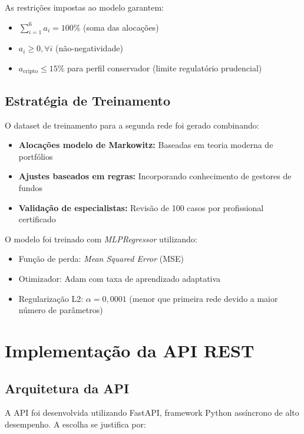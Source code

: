 As restrições impostas ao modelo garantem:
\begin{itemize}
    \item $\sum_{i=1}^{6} a_i = 100\%$ (soma das alocações)
    \item $a_i \geq 0, \forall i$ (não-negatividade)
    \item $a_{\text{cripto}} \leq 15\%$ para perfil conservador (limite regulatório prudencial)
\end{itemize}

\subsection{Estratégia de Treinamento}

O dataset de treinamento para a segunda rede foi gerado combinando:

\begin{itemize}
    \item \textbf{Alocações modelo de Markowitz:} Baseadas em teoria moderna de portfólios
    \item \textbf{Ajustes baseados em regras:} Incorporando conhecimento de gestores de fundos
    \item \textbf{Validação de especialistas:} Revisão de 100 casos por profissional certificado
\end{itemize}

O modelo foi treinado com \textit{MLPRegressor} utilizando:
\begin{itemize}
    \item Função de perda: \textit{Mean Squared Error} (MSE)
    \item Otimizador: Adam com taxa de aprendizado adaptativa
    \item Regularização L2: $\alpha = 0,0001$ (menor que primeira rede devido a maior número de parâmetros)
\end{itemize}

\section{Implementação da API REST}

\subsection{Arquitetura da API}

A API foi desenvolvida utilizando FastAPI, framework Python assíncrono de alto desempenho. A escolha se justifica por:

